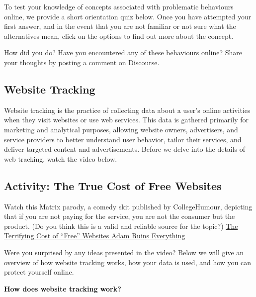 \documentclass[
]{book}
\theoremstyle{definition}
\theoremstyle{definition}
\theoremstyle{definition}
\theoremstyle{definition}
\theoremstyle{remark}
\begin{document}
\begin{reflect}
To test your knowledge of concepts associated with problematic behaviours online, we provide a short orientation quiz below. Once you have attempted your first answer, and in the event that you are not familiar or not sure what the alternatives mean, click on the options to find out more about the concept.

How did you do? Have you encountered any of these behaviours online? Share your thoughts by posting a comment on Discourse.
\end{reflect}

\hypertarget{website-tracking}{%
\subsection{Website Tracking}\label{website-tracking}}

Website tracking is the practice of collecting data about a user's online activities when they visit websites or use web services. This data is gathered primarily for marketing and analytical purposes, allowing website owners, advertisers, and service providers to better understand user behavior, tailor their services, and deliver targeted content and advertisements. Before we delve into the details of web tracking, watch the video below.

\hypertarget{activity-the-true-cost-of-free-websites}{%
\subsection*{Activity: The True Cost of Free Websites}\label{activity-the-true-cost-of-free-websites}}

\begin{reflect}
Watch this Matrix parody, a comedy skit published by CollegeHumour, depicting that if you are not paying for the service, you are not the consumer but the product. (Do you think this is a valid and reliable source for the topic?) \href{https://www.youtube.com/watch?v=5pFX2P7JLwA}{The Terrifying Cost of ``Free'' Websites \textbar{} Adam Ruins Everything}
\end{reflect}

Were you surprised by any ideas presented in the video? Below we will give an overview of how website tracking works, how your data is used, and how you can protect yourself online.

\textbf{How does website tracking work?}
\end{document}
